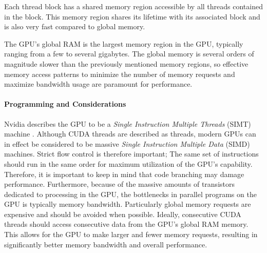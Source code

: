 Each thread block has a shared memory region accessible by all threads contained in the block.
This memory region shares its lifetime with its associated block and is also very fast compared to global memory.

The GPU's global RAM is the largest memory region in the GPU, typically ranging from a few to several gigabytes.
The global memory is several orders of magnitude slower than the previously mentioned memory regions, so effective memory access patterns to minimize the number of memory requests and maximize bandwidth usage are paramount for performance.

\paragraph{Programming and Considerations}
Nvidia describes the GPU to be a \textit{Single Instruction Multiple Threads} (SIMT) machine \cite{cuda}.
Although CUDA threads are described as threads, modern GPUs can in effect be considered to be massive \textit{Single Instruction Multiple Data} (SIMD) machines. 
Strict flow control is therefore important; 
The same set of instructions should run in the same order for maximum utilization of the GPU's capability.
Therefore, it is important to keep in mind that code branching may damage performance.
Furthermore, because of the massive amounts of transistors dedicated to processing in the GPU, the bottlenecks in parallel programs on the GPU is typically memory bandwidth.
Particularly global memory requests are expensive and should be avoided when possible.
Ideally, consecutive CUDA threads should access consecutive data from the GPU's global RAM memory.
This allows for the GPU to make larger and fewer memory requests, resulting in significantly better memory bandwidth and overall performance.

